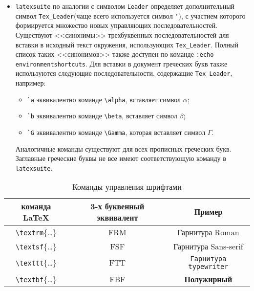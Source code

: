 \documentclass[a4paper]{article}
\begin{document}
\begin{itemize}
\begin{itemize}
\begin{itemize}
				\end{itemize}
		\end{itemize}
		Иногда всё же может потребоваться вставить в текст трехбуквенную абревиатуру, 
		которая не должны заменяться на соответствующую команду \LaTeX. Для этого нужно 
		ввести эту абревиатуру, она заменится на команду, после этого нужно нажать \texttt{u},
		то есть команду выполняющую отмену последнего действия, и в тексте останется 
		введенная абревиатура. 
	\item \texttt{latexsuite} по аналогии с символом \texttt{Leader} определяет
		дополнительный символ \verb|Tex_Leader|(чаще всего используется символ \texttt{`}),
		с участием которого формируется 
		множество новых управляющих последовательностей. Существуют <<синонимы>> трехбуквенных
		последовательностей для вставки в исходный текст  окружения, использующих
		\verb|Tex_Leader|. Полный список таких <<синонимов>> также доступен по команде
		\verb|:echo environmentshortcuts|. Для вставки в документ
		греческих букв также используются следующие последовательности, содержащие 
		\verb|Tex_Leader|, например:
		\begin{itemize}
			\item \verb|`a| эквивалентно команде \verb|\alpha|, вставляет символ $\alpha$;
			\item \verb|`b| эквивалентно команде \verb|\beta|, вставляет символ $\beta$;
			\item \verb|`G| эквивалентно команде \verb|\Gamma|, которая вставляет символ $\Gamma$.
		\end{itemize}
		Аналогичные команды существуют для всех прописных греческих букв. Заглавные греческие
		буквы не все имеют соответствующую команду в \texttt{latexsuite}.
\end{itemize}
			\begin{table}
				\centering
				\begin{tabular}{|c|c|c|}
					\hline
					команда \LaTeX&3-х буквенный эквивалент&Пример\\
					\hline
					\verb|\textrm|\{\ldots\}&FRM&\textrm{Гарнитура Roman}\\
					\verb|\textsf|\{\ldots\}&FSF&\textsf{Гарнитура Sans-serif}\\
					\verb|\texttt|\{\ldots\}&FTT&\texttt{Гарнитура typewriter}\\
					\verb|\textbf|\{\ldots\}&FBF&\textbf{Полужирный}\\
					\hline
				\end{tabular}
				\caption{Команды управления шрифтами}
				\label{tab:fonts}
			\end{table}
\end{document}
